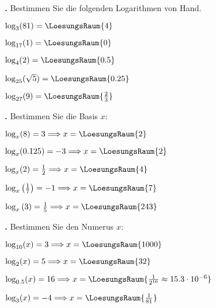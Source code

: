 \newpage

\textbf{\bbwAufgabenNummer{}.}
Bestimmen Sie die folgenden Logarithmen von Hand.

\begin{bbwAufgabenBlock}
\item $\log_3(81)     =    \LoesungsRaum{4}$
\item $\log_{17}(1)     =    \LoesungsRaum{0}$
\item $\log_4(2)     =    \LoesungsRaum{0.5}$
\item $\log_{25}(\sqrt{5})     =    \LoesungsRaum{0.25}$
\item $\log_{27}(9)     =    \LoesungsRaum{\frac23}$
\end{bbwAufgabenBlock}

\newpage

\textbf{\bbwAufgabenNummer{}.}
Bestimmen Sie die Basis $x$:

\begin{bbwAufgabenBlock}
\item $\log_x(8) = 3 \Longrightarrow x =    \LoesungsRaum{2}$
\item $\log_x(0.125) = -3 \Longrightarrow x =    \LoesungsRaum{2}$
\item $\log_x(2) = \frac12 \Longrightarrow x =    \LoesungsRaum{4}$
\item $\log_x\left(\frac17\right) = -1 \Longrightarrow x =    \LoesungsRaum{7}$
\item $\log_x\left( 3 \right) = \frac15 \Longrightarrow x =    \LoesungsRaum{243}$

\end{bbwAufgabenBlock}


\newpage

\textbf{\bbwAufgabenNummer{}.}
Bestimmen Sie den Numerus $x$:

\begin{bbwAufgabenBlock}
\item $\log_{10}(x)  =  3 \Longrightarrow x =    \LoesungsRaum{1000}$
\item $\log_{2}(x)   =  5 \Longrightarrow x =    \LoesungsRaum{32}$
\item $\log_{0.5}(x) = 16 \Longrightarrow x =    \LoesungsRaum{\frac1{2^{16}}\approx 15.3\cdot{}10^{-6}}$
\item $\log_{3}(x)   = -4 \Longrightarrow x =    \LoesungsRaum{\frac1{81}}$
\end{bbwAufgabenBlock}

